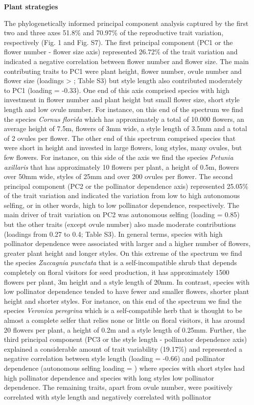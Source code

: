 \documentclass[
  12pt,
  a4paper,
]{article}
\begin{document}
\textbf{Plant strategies}

The phylogenetically informed principal component analysis captured by the first two and three axes 51.8\% and 70.97\% of the reproductive trait variation, respectively (Fig. 1 and Fig. S7). The first principal component (PC1 or the flower number - flower size axis) represented 26.72\% of the trait variation and indicated a negative correlation between flower number and flower size. The main contributing traits to PC1 were plant height, flower number, ovule number and flower size (loadings \textgreater{} \textbar; Table S3) but style length also contributed moderately to PC1 (loading = -0.33). One end of this axis comprised species with high investment in flower number and plant height but small flower size, short style length and low ovule number. For instance, on this end of the spectrum we find the species \emph{Cornus florida} which has approximately a total of 10.000 flowers, an average height of 7.5m, flowers of 3mm wide, a style length of 3.5mm and a total of 2 ovules per flower. The other end of this spectrum comprised species that were short in height and invested in large flowers, long styles, many ovules, but few flowers. For instance, on this side of the axis we find the species \emph{Petunia axillaris} that has approximately 10 flowers per plant, a height of 0.5m, flowers over 50mm wide, styles of 25mm and over 200 ovules per flower. The second principal component (PC2 or the pollinator dependence axis) represented 25.05\% of the trait variation and indicated the variation from low to high autonomous selfing, or in other words, high to low pollinator dependence, respectively. The main driver of trait variation on PC2 was autonomous selfing (loading = 0.85) but the other traits (except ovule number) also made moderate contributions (loadings from 0.27 to 0.4; Table S3). In general terms, species with high pollinator dependence were associated with larger and a higher number of flowers, greater plant height and longer styles. On this extreme of the spectrum we find the species \emph{Zuccagnia punctata} that is a self-incompatible shrub that depends completely on floral visitors for seed production, it has approximately 1500 flowers per plant, 3m height and a style length of 20mm. In contrast, species with low pollinator dependence tended to have fewer and smaller flowers, shorter plant height and shorter styles. For instance, on this end of the spectrum we find the species \emph{Veronica peregrina} which is a self-compatible herb that is thought to be almost a complete selfer that relies none or little on floral visitors, it has around 20 flowers per plant, a height of 0.2m and a style length of 0.25mm. Further, the third principal component (PC3 or the style length - pollinator dependence axis) explained a considerable amount of trait variability (19.17\%) and represented a negative correlation between style length (loading = -0.66) and pollinator dependence (autonomous selfing loading = \textbar) where species with short styles had high pollinator dependence and species with long styles low pollinator dependence. The remaining traits, apart from ovule number, were positively correlated with style length and negatively correlated with pollinator 
\end{document}
